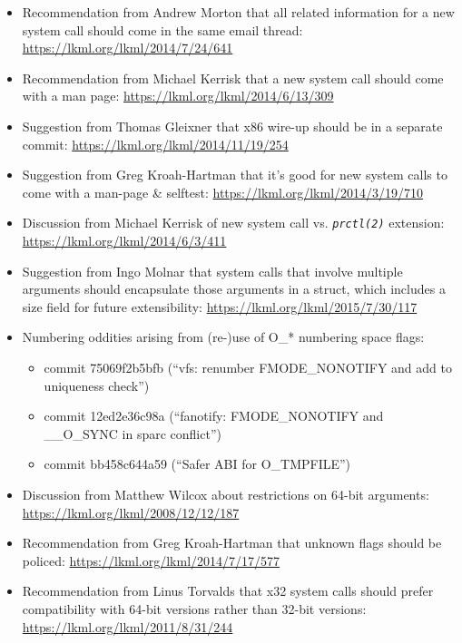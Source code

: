 \documentclass[a4paper,8pt,english]{sphinxmanual}
\begin{document}
\begin{itemize}
\item {} 
Recommendation from Andrew Morton that all related information for a new
system call should come in the same email thread:
\href{https://lkml.org/lkml/2014/7/24/641}{https://lkml.org/lkml/2014/7/24/641}

\item {} 
Recommendation from Michael Kerrisk that a new system call should come with
a man page: \href{https://lkml.org/lkml/2014/6/13/309}{https://lkml.org/lkml/2014/6/13/309}

\item {} 
Suggestion from Thomas Gleixner that x86 wire-up should be in a separate
commit: \href{https://lkml.org/lkml/2014/11/19/254}{https://lkml.org/lkml/2014/11/19/254}

\item {} 
Suggestion from Greg Kroah-Hartman that it's good for new system calls to
come with a man-page \& selftest: \href{https://lkml.org/lkml/2014/3/19/710}{https://lkml.org/lkml/2014/3/19/710}

\item {} 
Discussion from Michael Kerrisk of new system call vs. \emph{\texttt{prctl(2)}} extension:
\href{https://lkml.org/lkml/2014/6/3/411}{https://lkml.org/lkml/2014/6/3/411}

\item {} 
Suggestion from Ingo Molnar that system calls that involve multiple
arguments should encapsulate those arguments in a struct, which includes a
size field for future extensibility: \href{https://lkml.org/lkml/2015/7/30/117}{https://lkml.org/lkml/2015/7/30/117}

\item {} 
Numbering oddities arising from (re-)use of O\_* numbering space flags:
\begin{itemize}
\item {} 
commit 75069f2b5bfb (``vfs: renumber FMODE\_NONOTIFY and add to uniqueness
check'')

\item {} 
commit 12ed2e36c98a (``fanotify: FMODE\_NONOTIFY and \_\_O\_SYNC in sparc
conflict'')

\item {} 
commit bb458c644a59 (``Safer ABI for O\_TMPFILE'')

\end{itemize}

\item {} 
Discussion from Matthew Wilcox about restrictions on 64-bit arguments:
\href{https://lkml.org/lkml/2008/12/12/187}{https://lkml.org/lkml/2008/12/12/187}

\item {} 
Recommendation from Greg Kroah-Hartman that unknown flags should be
policed: \href{https://lkml.org/lkml/2014/7/17/577}{https://lkml.org/lkml/2014/7/17/577}

\item {} 
Recommendation from Linus Torvalds that x32 system calls should prefer
compatibility with 64-bit versions rather than 32-bit versions:
\href{https://lkml.org/lkml/2011/8/31/244}{https://lkml.org/lkml/2011/8/31/244}

\end{itemize}
\end{document}

